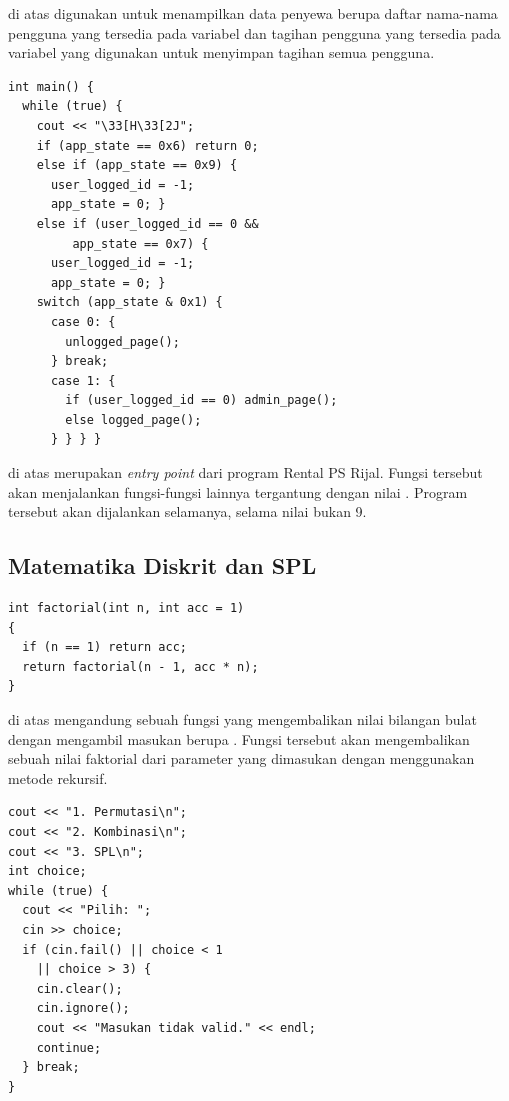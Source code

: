 \documentclass[../main.tex]{subfiles}
\begin{document}
{\Script} di atas digunakan untuk menampilkan data penyewa berupa daftar nama-nama pengguna yang tersedia pada variabel {\sarray}  dan tagihan pengguna yang tersedia pada variabel {\sarray}  yang digunakan untuk menyimpan tagihan semua pengguna.

\begin{code}
\begin{verbatim}
int main() {
  while (true) {
    cout << "\33[H\33[2J";
    if (app_state == 0x6) return 0;
    else if (app_state == 0x9) {
      user_logged_id = -1;
      app_state = 0; }
    else if (user_logged_id == 0 &&
         app_state == 0x7) {
      user_logged_id = -1;
      app_state = 0; }
    switch (app_state & 0x1) {
      case 0: {
        unlogged_page();
      } break;
      case 1: {
        if (user_logged_id == 0) admin_page();
        else logged_page();
      } } } }
\end{verbatim}
\end{code}

{\Script} di atas merupakan \textit{entry point} dari program Rental PS Rijal. Fungsi tersebut akan menjalankan fungsi-fungsi lainnya tergantung dengan nilai . Program tersebut akan dijalankan selamanya, selama nilai  bukan 9.

\subsection{Matematika Diskrit dan SPL}

\begin{code}
\begin{verbatim}
int factorial(int n, int acc = 1)
{
  if (n == 1) return acc;
  return factorial(n - 1, acc * n);
}
\end{verbatim}
\end{code}

{\Script} di atas mengandung sebuah fungsi yang mengembalikan nilai bilangan bulat dengan mengambil masukan berupa . Fungsi tersebut akan mengembalikan sebuah nilai faktorial dari parameter yang dimasukan dengan menggunakan metode rekursif.

\begin{code}
\begin{verbatim}
cout << "1. Permutasi\n";
cout << "2. Kombinasi\n";
cout << "3. SPL\n";
int choice;
while (true) {
  cout << "Pilih: ";
  cin >> choice;
  if (cin.fail() || choice < 1
    || choice > 3) {
    cin.clear();
    cin.ignore();
    cout << "Masukan tidak valid." << endl;
    continue;
  } break;
}
\end{verbatim}
\end{code}
\end{document}
